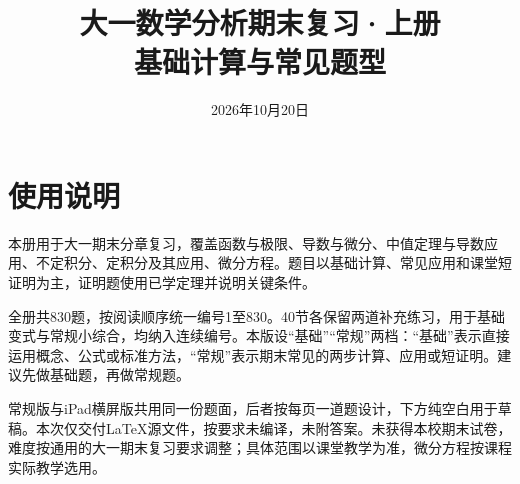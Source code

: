 \documentclass[11pt,a4paper,fontset=fandol]{ctexart}
\title{大一数学分析期末复习·上册\\[0.4em]\large 基础计算与常见题型}
\author{}
\date{2026年10月20日}
\begin{document}
\maketitle
\section*{使用说明}
本册用于大一期末分章复习，覆盖函数与极限、导数与微分、中值定理与导数应用、不定积分、定积分及其应用、微分方程。题目以基础计算、常见应用和课堂短证明为主，证明题使用已学定理并说明关键条件。

全册共830题，按阅读顺序统一编号1至830。40节各保留两道补充练习，用于基础变式与常规小综合，均纳入连续编号。本版设“基础”“常规”两档：“基础”表示直接运用概念、公式或标准方法，“常规”表示期末常见的两步计算、应用或短证明。建议先做基础题，再做常规题。

常规版与iPad横屏版共用同一份题面，后者按每页一道题设计，下方纯空白用于草稿。本次仅交付LaTeX源文件，按要求未编译，未附答案。未获得本校期末试卷，难度按通用的大一期末复习要求调整；具体范围以课堂教学为准，微分方程按课程实际教学选用。
\tableofcontents
\clearpage

\clearpage

\clearpage

\clearpage

\clearpage

\clearpage

\clearpage

\end{document}
